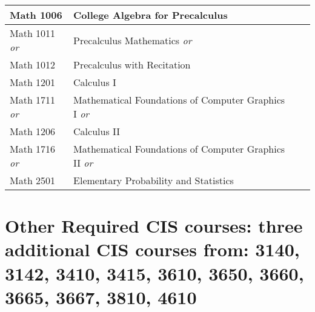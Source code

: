 \documentclass{article}
\begin{document}
\begin{Form}
\begin{tabular}{ |p{3.27cm}|p{6cm}|p{4.8cm}|p{2.3cm}|  }
		Math 1006           & College Algebra for Precalculus                            & \TextField[name=M1006_instructor,width=4.8cm,charsize=8pt,bordercolor=1 1 1,borderstyle=U]{} & \TextField[name=M1006_grade,width=2.2cm,charsize=8pt,bordercolor=1 1 1]{{}} \\
		\hline
		Math 1011 \emph{or} & Precalculus Mathematics \emph{or}                          & \TextField[name=M1011_instructor,width=4.8cm,charsize=8pt,bordercolor=1 1 1,borderstyle=U]{} & \TextField[name=M1011_grade,width=2.2cm,charsize=8pt,bordercolor=1 1 1]{{}} \\
		Math 1012           & Precalculus with Recitation                                & \TextField[name=M1012_instructor,width=4.8cm,charsize=8pt,bordercolor=1 1 1,borderstyle=U]{} & \TextField[name=M1012_grade,width=2.2cm,charsize=8pt,bordercolor=1 1 1]{{}} \\
		\hline
		Math 1201           & Calculus I                                                 & \TextField[name=M1201_instructor,width=4.8cm,charsize=8pt,bordercolor=1 1 1,borderstyle=U]{} & \TextField[name=M1201_grade,width=2.2cm,charsize=8pt,bordercolor=1 1 1]{{}} \\
		\hline
		Math 1711 \emph{or} & Mathematical Foundations of Computer Graphics I \emph{or}  & \TextField[name=M1711_instructor,width=4.8cm,charsize=8pt,bordercolor=1 1 1,borderstyle=U]{} & \TextField[name=M1711_grade,width=2.2cm,charsize=8pt,bordercolor=1 1 1]{{}} \\
		Math 1206           & Calculus II                                                & \TextField[name=M1206_instructor,width=4.8cm,charsize=8pt,bordercolor=1 1 1,borderstyle=U]{} & \TextField[name=M1206_grade,width=2.2cm,charsize=8pt,bordercolor=1 1 1]{{}} \\
		\hline
		Math 1716 \emph{or} & Mathematical Foundations of Computer Graphics II \emph{or} & \TextField[name=M1716_instructor,width=4.8cm,charsize=8pt,bordercolor=1 1 1,borderstyle=U]{} & \TextField[name=M1716_grade,width=2.2cm,charsize=8pt,bordercolor=1 1 1]{{}} \\
		Math 2501           & Elementary Probability and Statistics                      & \TextField[name=M2501_instructor,width=4.8cm,charsize=8pt,bordercolor=1 1 1,borderstyle=U]{} & \TextField[name=M2501_grade,width=2.2cm,charsize=8pt,bordercolor=1 1 1]{{}} \\
		\hline
	\end{tabular}

	\section*{Other Required CIS courses: \large{three additional CIS courses from: 3140, 3142, 3410, 3415, 3610, 3650, 3660, 3665, 3667, 3810, 4610}}
	\setlength\tabcolsep{4pt}


\end{Form}
\end{document}
